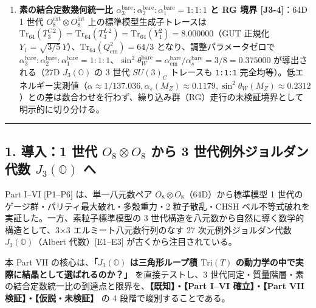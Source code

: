 \documentclass[
  a4paper,
]{ltjsarticle}
\begin{document}
\begin{enumerate}
  へは自動ロックしないことを反証境界として明示した。
\item
  \textbf{素の結合定数幾何統一比
  \(\alpha_3^{\mathrm{bare}} : \alpha_2^{\mathrm{bare}} : \alpha_1^{\mathrm{bare}} = 1:1:1\)
  と RG 境界 {[}J3-4{]}}：64D 1 世代
  \(O_8^{\mathrm{ext}}\otimes O_8^{\mathrm{int}}\)
  上の標準模型生成子トレースは
  \(\mathrm{Tr}_{64}(T_3^{C\,2}) = \mathrm{Tr}_{64}(T_3^{L\,2}) = \mathrm{Tr}_{64}(Y_1^2) = \mathbf{8.000000}\)（GUT
  正規化
  \(Y_1 = \sqrt{3/5}\,Y\)）、\(\mathrm{Tr}_{64}(Q_{\mathrm{em}}^2) = 64/3\)
  となり、調整パラメータゼロで
  \textbf{\(\alpha_3^{\mathrm{bare}} : \alpha_2^{\mathrm{bare}} : \alpha_1^{\mathrm{bare}} = 1 : 1 : 1\)}、\textbf{\(\sin^2\theta_W^{\mathrm{bare}} = \alpha_{\mathrm{em}}^{\mathrm{bare}}/\alpha_s^{\mathrm{bare}} = 3/8 = 0.375000\)}
  が導出される（27D \(J_3(\mathbb{O})\) の 3 世代 \(SU(3)_C\) トレースも
  \texttt{1:1:1}
  完全均等）。低エネルギー実測値（\(\alpha \approx 1/137.036, \alpha_s(M_Z) \approx 0.1179, \sin^2\theta_W(M_Z) \approx 0.2312\)）との差は数合わせを行わず、繰り込み群（RG）走行の未検証境界として明示的に切り分ける。
\end{enumerate}

\begin{center}\rule{0.5\linewidth}{0.5pt}\end{center}

\subsection{\texorpdfstring{1. 導入：1 世代 \(O_8 \otimes O_8\) から 3
世代例外ジョルダン代数 \(J_3(\mathbb{O})\)
へ}{1. 導入：1 世代 O\_8 \textbackslash otimes O\_8 から 3 世代例外ジョルダン代数 J\_3(\textbackslash mathbb\{O\}) へ}}\label{ux5c0eux51651-ux4e16ux4ee3-o_8-otimes-o_8-ux304bux3089-3-ux4e16ux4ee3ux4f8bux5916ux30b8ux30e7ux30ebux30c0ux30f3ux4ee3ux6570-j_3mathbbo-ux3078}

Part I--VI {[}P1--P6{]} は、単一八元数ペア
\(O_8 \otimes O_8\)（64D）から標準模型 1
世代のゲージ群・パリティ最大破れ・多殻重力・2 粒子散乱・CHSH
ベル不等式破れを実証した。一方、素粒子標準模型の 3
世代構造を八元数から自然に導く数学的構造として、3×3
エルミート八元数行列のなす 27 次元例外ジョルダン代数
\(J_3(\mathbb{O})\)（Albert 代数）{[}E1--E3{]}
が古くから注目されている。

本 Part VII の核心は、\textbf{「\(J_3(\mathbb{O})\) は三角形ループ積
\(\mathrm{Tri}(T)\) の動力学の中で実際に結晶として選ばれるのか？」}
を直接テストし、3
世代同定・質量階層・素の結合定数統一比の到達点と限界を、\textbf{【既知】・【Part
I--VI 確立】・【Part VII 検証】・【仮説・未検証】} の 4
段階で峻別することである。
\end{document}
